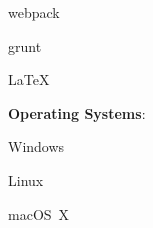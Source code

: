 \documentclass[10pt]{article} %
\begin{document}
\begin{minipage}[c]{\linewidth}
\begin{multicols*}{3}
\begin{multicols}{2}
\begin{loneinnerlist}
				\item webpack
				\item grunt
				\item \LaTeX
			\end{loneinnerlist}
		\end{multicols}
		\columnbreak
		\textbf{Operating Systems}:
			\begin{loneinnerlist}
				\item Windows
				\item Linux
				\item macOS~X
				\item[]
				\item[]
			\end{loneinnerlist}
	\end{multicols*}%
	\end{minipage}%
	\vspace*{0.25\baselineskip}
\end{document}
